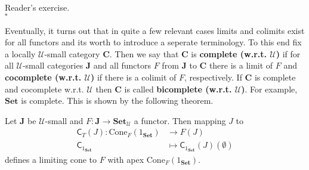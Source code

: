 \begin{prf}
Reader's exercise.
\\
\phantom{proven}
\hfill
$\square$
\end{prf}
Eventually, it turns out that in quite a few relevant cases limits and colimits exist for all functors and its worth to introduce a seperate terminology. To this end fix a locally $\mathcal{U}$-small category $\mathbf{C}$. Then we say that $\mathbf{C}$ is \textbf{complete (w.r.t. $\mathcal{U}$)} if for all $\mathcal{U}$-small categories $\mathbf{J}$ and all functors $F$ from $\mathbf{J}$ to $\mathbf{C}$ there is a limit of $F$ and \textbf{cocomplete (w.r.t. $\mathcal{U}$)} if there is a colimit of $F$, respectively. If $\mathbf{C}$ is complete and cocomplete w.r.t. $\mathcal{U}$ then $\mathbf{C}$ is called \textbf{bicomplete (w.r.t. $\mathcal{U}$)}. For example, $\mathbf{Set}$ is complete. This is shown by the following theorem.
\\
\begin{thm}
\label{thm:setcomplete}
Let $\mathbf{J}$ be $\mathcal{U}$-small and $F \colon \mathbf{J} \rightarrow \mathbf{Set}_{\mathcal{U}}$ a functor. Then mapping $J$ to
\begin{align*}
  \mathsf{C}_{T}(J)
  \colon
  \mathrm{Cone}_{F}(1_{\mathbf{Set}})
  &\rightarrow
  F(J)
  \\
  \mathsf{C}_{1_{\mathbf{Set}}}
  &\mapsto
  \mathsf{C}_{1_{\mathbf{Set}}}(J)(\emptyset)
\end{align*}
defines a limiting cone to $F$ with apex $\mathrm{Cone}_{F}(1_{\mathbf{Set}})$.
\end{thm}
